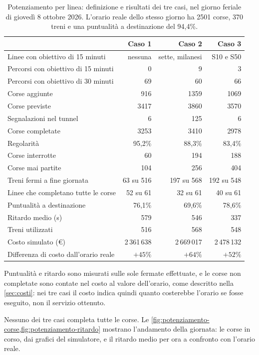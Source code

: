 \begin{table}[H]
	\centering
	\caption{Potenziamento per linea: definizione e risultati dei tre casi, nel giorno feriale di giovedì 8 ottobre 2026. L'orario reale dello stesso giorno ha 2501 corse, 370 treni e una puntualità a destinazione del 94,4\%.}
	\label{tab:risultati-potenziamento}
	\begin{tabularx}{\textwidth}{Xrrr}
		\toprule
		 & Caso 1 & Caso 2 & Caso 3 \\
		\midrule
		Linee con obiettivo di 15 minuti & nessuna & sette, milanesi & S10 e S50 \\
		Percorsi con obiettivo di 15 minuti & 0 & 9 & 3 \\
		Percorsi con obiettivo di 30 minuti & 69 & 60 & 66 \\
		Corse aggiunte & 916 & 1359 & 1069 \\
		Corse previste & 3417 & 3860 & 3570 \\
		Segnalazioni nel tunnel & 6 & 125 & 6 \\
		\midrule
		Corse completate & 3253 & 3410 & 2978 \\
		Regolarità & 95,2\% & 88,3\% & 83,4\% \\
		Corse interrotte & 60 & 194 & 188 \\
		Corse mai partite & 104 & 256 & 404 \\
		Treni fermi a fine giornata & 63 su 516 & 197 su 568 & 192 su 548 \\
		Linee che completano tutte le corse & 52 su 61 & 32 su 61 & 40 su 61 \\
		\midrule
		Puntualità a destinazione & 76,1\% & 69,6\% & 78,6\% \\
		Ritardo medio (s) & 579 & 546 & 337 \\
		Treni utilizzati & 516 & 568 & 548 \\
		Costo simulato (\euro) & 2\,361\,638 & 2\,669\,017 & 2\,478\,132 \\
		Differenza di costo dall'orario reale & $+45\%$ & $+64\%$ & $+52\%$ \\
		\bottomrule
	\end{tabularx}
\end{table}

Puntualità e ritardo sono misurati sulle sole fermate effettuate, e le corse non completate sono contate nel costo al valore dell'orario, come descritto nella \cref{sec:costi}: nei tre casi il costo indica quindi quanto costerebbe l'orario se fosse eseguito, non il servizio ottenuto.

Nessuno dei tre casi completa tutte le corse. Le \cref{fig:potenziamento-corse,fig:potenziamento-ritardo} mostrano l'andamento della giornata: le corse in corso, dai grafici del simulatore, e il ritardo medio per ora a confronto con l'orario reale.


